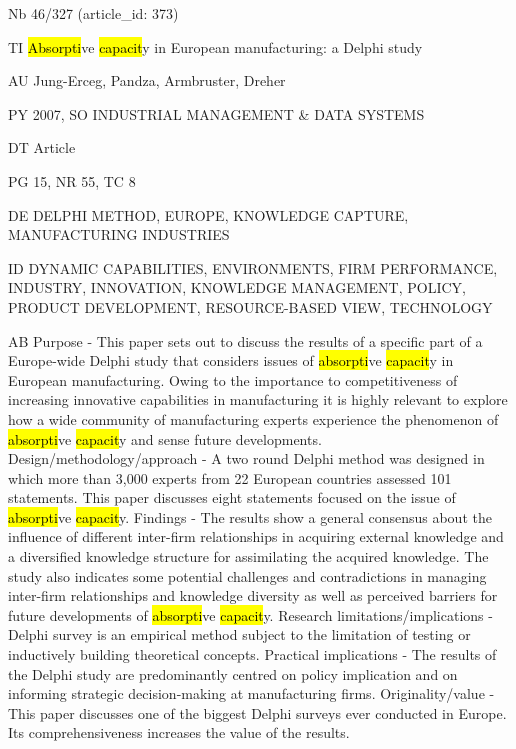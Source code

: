 \documentclass[a4paper]{article}
\begin{document}
\vspace*{-2cm}
Nb \tabto{0cm}46/327 (article\_id: 373)\par
TI \tabto{0cm}\hl{Absorpti}ve \hl{capacit}y in European manufacturing: a Delphi study\par
AU \tabto{0cm}Jung-Erceg, Pandza, Armbruster, Dreher\par
PY \tabto{0cm}2007, SO INDUSTRIAL MANAGEMENT \& DATA SYSTEMS\par
DT \tabto{0cm}Article\par
PG \tabto{0cm}15, NR 55, TC 8\par
DE \tabto{0cm}DELPHI METHOD, EUROPE, KNOWLEDGE CAPTURE, MANUFACTURING INDUSTRIES\par
ID \tabto{0cm}DYNAMIC CAPABILITIES, ENVIRONMENTS, FIRM PERFORMANCE, INDUSTRY, INNOVATION, KNOWLEDGE MANAGEMENT, POLICY, PRODUCT DEVELOPMENT, RESOURCE-BASED VIEW, TECHNOLOGY\par
AB \tabto{0cm}Purpose - This paper sets out to discuss the results of a specific part of a Europe-wide Delphi study that considers issues of \hl{absorpti}ve \hl{capacit}y in European manufacturing. Owing to the importance to competitiveness of increasing innovative capabilities in manufacturing it is highly relevant to explore how a wide community of manufacturing experts experience the phenomenon of \hl{absorpti}ve \hl{capacit}y and sense future developments.
Design/methodology/approach - A two round Delphi method was designed in which more than 3,000 experts from 22 European countries assessed 101 statements. This paper discusses eight statements focused on the issue of \hl{absorpti}ve \hl{capacit}y.
Findings - The results show a general consensus about the influence of different inter-firm relationships in acquiring external knowledge and a diversified knowledge structure for assimilating the acquired knowledge. The study also indicates some potential challenges and contradictions in managing inter-firm relationships and knowledge diversity as well as perceived barriers for future developments of \hl{absorpti}ve \hl{capacit}y.
Research limitations/implications - Delphi survey is an empirical method subject to the limitation of testing or inductively building theoretical concepts.
Practical implications - The results of the Delphi study are predominantly centred on policy implication and on informing strategic decision-making at manufacturing firms.
Originality/value - This paper discusses one of the biggest Delphi surveys ever conducted in Europe. Its comprehensiveness increases the value of the results.\par
\clearpage
\end{document}
